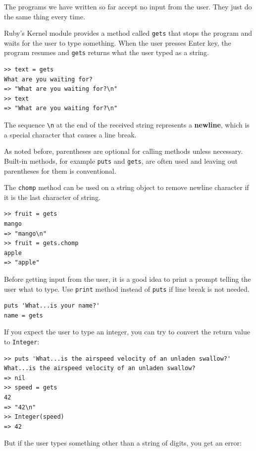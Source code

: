 \documentclass[10pt]{book}
\begin{document}
The programs we have written so far accept no input from the user.
They just do the same thing every time.

Ruby's Kernel module provides a method called {\tt gets} that
stops the program and
waits for the user to type something.  When the user presses
{\sf Enter} key, the program resumes and \verb"gets"
returns what the user typed as a string.

\begin{verbatim}
>> text = gets
What are you waiting for?
=> "What are you waiting for?\n"
>> text
=> "What are you waiting for?\n"
\end{verbatim}
%
The sequence \verb"\n" at the end of the received string represents a
{\bf newline}, which is a special character that causes a line break.

As noted before, parentheses are optional for calling methods
unless necessary.  Built-in methods, for example {\tt puts} and {\tt gets},
are often used and leaving out parentheses for them is conventional.

The {\tt chomp} method can be used on a string object
to remove newline character if it is the last character of string.

\begin{verbatim}
>> fruit = gets
mango
=> "mango\n"
>> fruit = gets.chomp
apple
=> "apple"
\end{verbatim}

Before getting input from the user, it is a good idea to print a
prompt telling the user what to type.  Use {\tt print} method
instead of {\tt puts} if line break is not needed.

\begin{verbatim}
puts 'What...is your name?'
name = gets
\end{verbatim}
%

If you expect the user to type an integer, you can try to convert
the return value to {\tt Integer}:

\begin{verbatim}
>> puts 'What...is the airspeed velocity of an unladen swallow?'
What...is the airspeed velocity of an unladen swallow?
=> nil
>> speed = gets
42
=> "42\n"
>> Integer(speed)
=> 42
\end{verbatim}
%
But if the user types something other than a string of digits,
you get an error:
\end{document}
